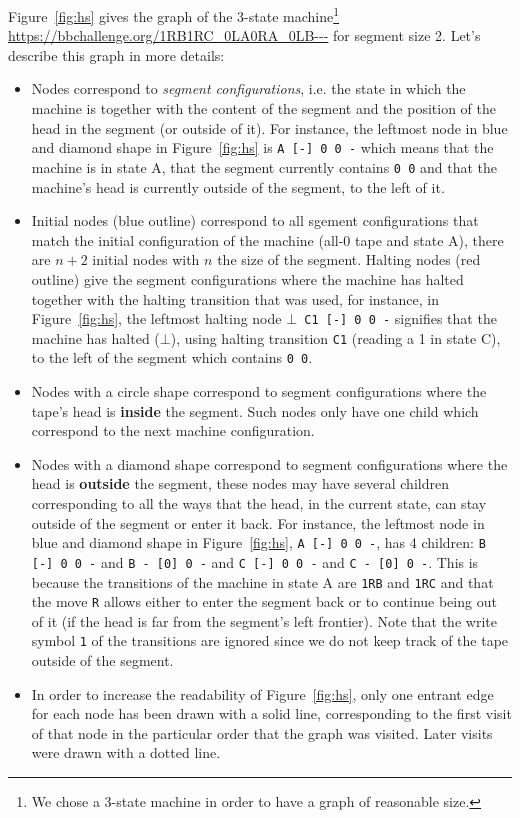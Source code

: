 Figure~\ref{fig:hs} gives the \HS graph of the 3-state machine\footnote{We chose a 3-state machine in order to have a graph of reasonable size.} \url{https://bbchallenge.org/1RB1RC_0LA0RA_0LB---} for segment size 2. Let's describe this graph in more details:

\begin{itemize}
  \item Nodes correspond to \textit{segment configurations}, i.e. the state in which the machine is together with the content of the segment and the position of the head in the segment (or outside of it). For instance, the leftmost node in blue and diamond shape in Figure~\ref{fig:hs} is \texttt{A [-] 0 0 -} which means that the machine is in state A, that the segment currently contains \texttt{0 0} and that the machine's head is currently outside of the segment, to the left of it.

  \item Initial nodes (blue outline) correspond to all sgement configurations that match the initial configuration of the machine (all-0 tape and state A), there are $n+2$ initial nodes with $n$ the size of the segment. Halting nodes (red outline) give the segment configurations where the machine has halted together with the halting transition that was used, for instance, in Figure~\ref{fig:hs}, the leftmost halting node \texttt{$\bot$ C1 [-] 0 0 -} signifies that the machine has halted ($\bot$), using halting transition \texttt{C1} (reading a 1 in state C), to the left of the segment which contains \texttt{0 0}.

  \item Nodes with a circle shape correspond to segment configurations where the tape's head is \textbf{inside} the segment. Such nodes only have one child which correspond to the next machine configuration.

  \item Nodes with a diamond shape correspond to segment configurations where the head is \textbf{outside} the segment, these nodes may have several children corresponding to all the ways that the head, in the current state, can stay outside of the segment or enter it back. For instance, the leftmost node in blue and diamond shape in Figure~\ref{fig:hs}, \texttt{A [-] 0 0 -}, has 4 children: \texttt{B [-] 0 0 -} and \texttt{B - [0] 0 -} and \texttt{C [-] 0 0 -} and \texttt{C - [0] 0 -}. This is because the transitions of the machine in state A are \texttt{1RB} and \texttt{1RC} and that the move \texttt{R} allows either to enter the segment back or to continue being out of it (if the head is far from the segment's left frontier). Note that the write symbol \texttt{1} of the transitions are ignored since we do not keep track of the tape outside of the segment.

  \item In order to increase the readability of Figure~\ref{fig:hs}, only one entrant edge for each node has been drawn with a solid line, corresponding to the first visit of that node in the particular order that the graph was visited. Later visits were drawn with a dotted line.
\end{itemize}

